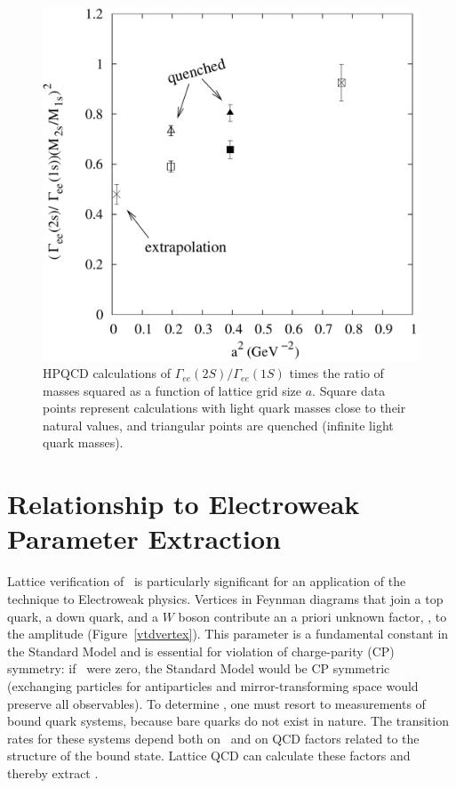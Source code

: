 \documentclass{cornell}
\begin{document}
\begin{figure}[p]
  \begin{center}
    \includegraphics[width=\linewidth]{newplots/latticespacing}
  \end{center}
  \caption[HPQCD results for
  $\Gamma_{ee}(2S)/\Gamma_{ee}(1S)$]{\label{latticespacing} HPQCD
  calculations of $\Gamma_{ee}(2S)/\Gamma_{ee}(1S)$ times the ratio of
  masses squared as a function of lattice grid size $a$.  Square data
  points represent calculations with light quark masses close to their
  natural values, and triangular points are quenched (infinite light
  quark masses).}
\end{figure}

\section{Relationship to Electroweak Parameter Extraction}

Lattice verification of \gee\ is particularly significant for an
application of the technique to Electroweak physics.  Vertices in
Feynman diagrams that join a top quark, a down quark, and a $W$ boson
contribute an a priori unknown factor, \vtd, to the amplitude
(Figure~\ref{vtdvertex}).  This parameter is a fundamental constant in
the Standard Model and is essential for violation of charge-parity
(CP) symmetry: if \vtd\ were zero, the Standard Model would be CP
symmetric (exchanging particles for antiparticles and
mirror-transforming space would preserve all observables).  To
determine \vtd, one must resort to measurements of bound quark
systems, because bare quarks do not exist in nature.  The transition
rates for these systems depend both on \vtd\ and on QCD factors
related to the structure of the bound state.  Lattice QCD can
calculate these factors and thereby extract \vtd.
\end{document}
